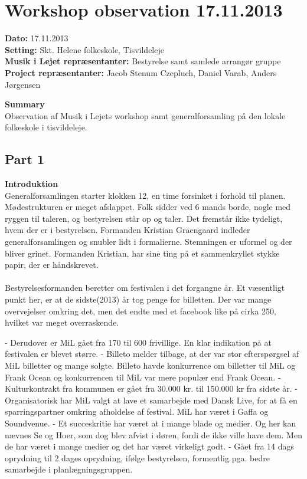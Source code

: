 \section{Workshop observation 17.11.2013}

\textbf{Dato:} 17.11.2013 \\
\textbf{Setting:} Skt. Helene folkeskole, Tisvildeleje \\
\textbf{Musik i Lejet repræsentanter:} Bestyrelse samt samlede arrangør gruppe \\
\textbf{Project repræsentanter:} Jacob Stenum Czepluch, Daniel Varab, Anders Jørgensen

\bigskip

\noindent \textbf{Summary} \\
Observation af Musik i Lejets workshop samt generalforsamling på den lokale folkeskole i tisvildeleje.

\subsection{Part 1}
\noindent \textbf{Introduktion} \\
Generalforsamlingen starter klokken 12, en time forsinket i forhold til planen. Mødestrukturen er meget afslappet. Folk sidder ved 6 mands borde, nogle med ryggen til taleren, og bestyrelsen står op og taler. Det fremstår ikke tydeligt, hvem der er i bestyrelsen. Formanden Kristian Graengaard indleder generalforsamlingen og snubler lidt i formalierne. Stemningen er uformel og der bliver grinet. Formanden Kristian, har sine ting på et sammenkryllet stykke papir, der er håndskrevet.
\\ \\
Bestyrelsesformanden beretter om festivalen i det forgangne år. Et væsentligt punkt her, er at de sidste(2013) år tog penge for billetten. Der var mange overvejelser omkring det, men det endte med et facebook like på cirka 250, hvilket var meget overraskende.


- Derudover er MiL gået fra 170 til 600 frivillige. En klar indikation på at festivalen er blevet større. 
- Billeto melder tilbage, at der var stor efterspørgsel af MiL billetter og mange solgte. Billeto havde konkurrence om billetter til MiL og Frank Ocean og konkurrencen til MiL var mere populær end Frank Ocean. 
- Kulturkontrakt fra kommunen er gået fra 30.000 kr. til 150.000 kr fra sidste år.
- Organisatorisk har MiL valgt at lave et samarbejde med Dansk Live, for at få en sparringspartner omkring afholdelse af festival. MiL har været i Gaffa og Soundvenue.
- Et succeskritie har været at i mange blade og medier. Og her kan nævnes Se og Hoer, som dog blev afvist i døren, fordi de ikke ville have dem. Men de har været i mange medier og det har været virkeligt godt.
- Gået fra 14 dags oprydning til 2 dages oprydning, ifølge bestyrelsen, formentlig pga. bedre samarbejde i planlægningsgruppen.


